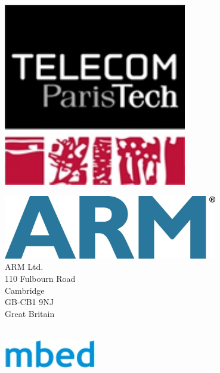 
\begin{titlepage}
\begin{center}

\begin{minipage}{0.4\textwidth}
\begin{flushleft}
\includegraphics[width=0.6\textwidth]{./logo_telecom.jpg}
\end{flushleft}
\end{minipage}
\begin{minipage}{0.4\textwidth}
\begin{flushright} \large
\includegraphics[width=0.7\textwidth]{./arm.jpg}\\
ARM Ltd. \\                                                                
110 Fulbourn Road \\
Cambridge \\
GB-CB1 9NJ \\
Great Britain \\
\end{flushright}
\end{minipage}\\[1.5cm]

\includegraphics[width=0.3\textwidth]{./mbed.jpg}\\[1.5cm]


\end{center}
\end{titlepage}
